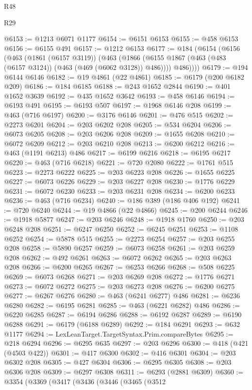 \begin{lexlean}{R48}
\begin{lexlean}{R29}
\begin{coremodule}
{{{{{{{{{{{{{{{{{{{{{{{{{{{{{{{{{{{{{{{{{{{{{{{{{{{{{{{{{{{{{{{{{{{{{{{{{{{{{{{{{{{{{{{{{{{{{{{{{{{{{{{{{{{{{{{{{{{{{{{{{{{{{{{{{{{{{{{{{{{{{{{{{{{{{{{{{{{{{{{{{{{{{{{{{{{{{{{{{{{{{{{{{{{{{{{{{{{{{{{{{{{{{{{{{{{{{{{{{{@6153 := @1213 @6071 @1177
@6154 := @6151 @6153
@6155 := @458 @6153
@6156 := @6155 @491
@6157 := @1212 @6153
@6177 := @184
    (@6154
      (@6156
        (@463
          (@1861 (@6157 @3119))
          (@463
            (@1866 (@6155 @1867 (@463 (@483 (@6157 @3124)) (@463 (@469 (@6062 @3128)) @486))))
            @486))))
@6179 := @194 @6144 @6146
@6182 := @19 @4861 (@22 @4861)
@6185 := @6179 (@200 @6182 @209)
@6186 := @184 @6185
@6188 := @243 @1652 @2844
@6190 := @401 @1652 @3639
@6192 := @435 @1652 @3642
@6193 := @458 @6146
@6194 := @6193 @491
@6195 := @6193 @507
@6197 := @1968 @6146 @208
@6199 := @463 (@716 @6197)
@6200 := @3176 @6146
@6201 := @476 @515
@6202 := @2273 @6201
@6204 := @203 @6202 @208
@6205 := @534 @6204
@6206 := @6073 @6205
@6208 := @203 @6206 @208
@6209 := @1655 @6208
@6210 := @6072 @6209
@6212 := @203 @6210 @208
@6213 := @6200 @6212
@6216 := @463 (@1191 @6213) @486
@6217 := @6199 @6216
@6218 := @6195 @6217
@6220 := @463 (@716 @6218)
@6221 := @720 @2080
@6222 := @1761 @515
@6223 := @2273 @6222
@6225 := @203 @6223 @208
@6226 := @1655 @6225
@6227 := @6073 @6226
@6229 := @203 @6227 @208
@6230 := @1776 @6229
@6231 := @6072 @6230
@6233 := @203 @6231 @208
@6234 := @6200 @6233
@6236 := @463 (@716 @6234)
@6240 := @186 @389 (@186 @406 @192)
@6241 := @720 @6240
@6244 := @19 @4866 (@22 @4866)
@6245 := @200 @6244
@6246 := @1918 @5877
@6247 := @203 @6246
@6248 := @1918 @1760
@6250 := @203 @6248 @208
@6251 := @6247 @6250
@6252 := @6245 @6251
@6253 := @1108 @6252
@6254 := @5878 @515
@6255 := @2273 @6254
@6257 := @203 @6255 @208
@6258 := @5890 @6257
@6259 := @6073 @6258
@6261 := @203 @6259 @208
@6262 := @492 @6261
@6263 := @6072 @6262
@6265 := @203 @6263 @208
@6266 := @6200 @6265
@6267 := @6253 @6266
@6268 := @508 @6225
@6269 := @6073 @6268
@6271 := @203 @6269 @208
@6272 := @1776 @6271
@6273 := @6072 @6272
@6275 := @203 @6273 @208
@6276 := @6200 @6275
@6277 := @6267 @6276
@6280 := @463 (@6241 @6277) @486
@6281 := @6236 @6280
@6282 := @6195 @6281
@6285 := @463 (@6221 @6282) @486
@6286 := @6220 @6285
@6287 := @6194 @6286
@6288 := @6192 @6287
@6289 := @6190 @6288
@6291 := @6179 (@6188 @6289)
@6292 := @184 @6291
@6293 := @632 @1177
@6294 := LexLeanTarget.TargetSyntax.Prim.compareBytes
@6295 := @218 @6294
@6296 := @6295 @635
@6297 := @203 @6296
@6300 := @418 (@421 (@4503 @422))
@6301 := @417 @6300
@6302 := @416 @6301
@6304 := @203 @6302 @208
@6305 := @427 @6304
@6306 := @6295 @6305
@6308 := @203 @6306 @208
@6309 := @6297 @6308
@6311 := @6293 (@2881 @6309)
@6360 := @3354
    (@3369
      (@3417
        (@3436
          (@3446
            (@3465
              (@3512
}}}}}}}}}}}}}}}}}}}}}}}}}}}}}}}}}}}}}}}}}}}}}}}}}}}}}}}}}}}}}}}}}}}}}}}}}}}}}}}}}}}}}}}}}}}}}}}}}}}}}}}}}}}}}}}}}}}}}}}}}}}}}}}}}}}}}}}}}}}}}}}}}}}}}}}}}}}}}}}}}}}}}}}}}}}}}}}}}}}}}}}}}}}}}}}}}}}}}}}}}}}}}}}}}}}}}}}}}}
\end{coremodule}
\end{lexlean}
\end{lexlean}
